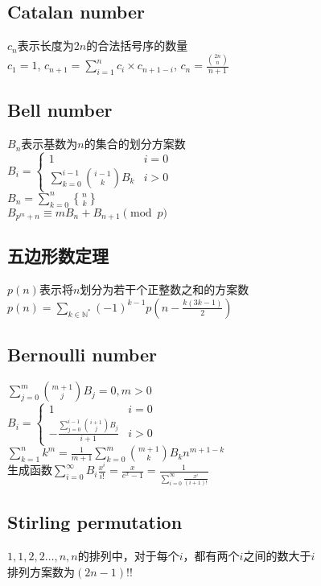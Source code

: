\subsection*{Catalan number}
    $ c_n $表示长度为$ 2n $的合法括号序的数量
    \\$ c_1 = 1 $, $ c_{n+1} = \sum\limits_{i=1}^{n} c_i \times c_{n + 1 - i} $, $ c_n = \frac{\binom{2n}{n}}{n + 1} $

\subsection*{Bell number}
    $ B_n $表示基数为$ n $的集合的划分方案数
    \\$ B_i = \begin{cases}
        1 & i = 0\\
        \sum\limits_{k = 0}^{i - 1} \binom{i - 1}{k} B_k & i > 0
    \end{cases} $
    \\$ B_n = \sum\limits_{k = 0}^{n} {n \brace k} $
    \\$ B_{p^m + n} \equiv m B_n + B_{n + 1} \pmod p $

\subsection*{五边形数定理}
    $ p(n) $表示将$ n $划分为若干个正整数之和的方案数
    \\$ p(n) = \sum\limits_{k \in \mathbb{N}^\ast} (-1)^{k - 1} p(n - \frac{k(3k - 1)}{2}) $

\subsection*{Bernoulli number}
    \noindent$ \sum\limits_{j = 0}^{m} \binom{m + 1}{j} B_j = 0, m > 0 $
    \\$ B_i = \begin{cases}
        1 & i = 0\\
        -\frac{\sum\limits_{j = 0}^{i - 1} \binom{i + 1}{j} B_j}{i + 1} & i > 0
    \end{cases} $
    \\$ \sum\limits_{k = 1}^{n} k ^ m = \frac{1}{m + 1} \sum\limits_{k = 0}^{m} \binom{m + 1}{k} B_k n ^ {m + 1 - k} $
    \\生成函数$ \sum\limits_{i = 0}^{\infty} B_i \frac{x^i}{i!} = \frac{x}{e^x - 1} = \frac{1}{\sum\limits_{i = 0}^{\infty} \frac{x^i}{(i + 1)!}} $

\subsection*{Stirling permutation}
    $ 1, 1, 2, 2 \dots , n, n $的排列中，对于每个$ i $，都有两个$ i $之间的数大于$ i $
    \\排列方案数为$ (2n - 1)!! $

